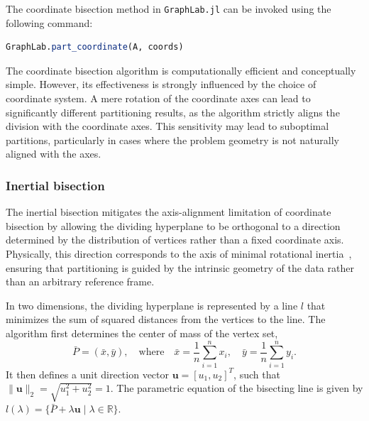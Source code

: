     
    
    
    
    The coordinate bisection method in \texttt{GraphLab.jl} can be invoked using the following command:
    
    \begin{lstlisting}[language=Julia]
    GraphLab.part_coordinate(A, coords)
    \end{lstlisting}
    
    The coordinate bisection algorithm is computationally efficient and conceptually simple.
    However, its effectiveness is strongly influenced by the choice of coordinate system.
    A mere rotation of the coordinate axes can lead to significantly different partitioning results,
    as the algorithm strictly aligns the division with the coordinate axes.
    This sensitivity may lead to suboptimal partitions, particularly in cases where the problem geometry
    is not naturally aligned with the axes.
    \subsubsection{Inertial bisection}
    The inertial bisection mitigates the axis-alignment limitation of coordinate bisection by
    allowing the dividing hyperplane to be orthogonal to a direction determined by the
    distribution of vertices rather than a fixed coordinate axis. Physically, this direction corresponds to the axis of minimal rotational inertia~\cite{elsner1997graph}, ensuring that
    partitioning is guided by the intrinsic geometry of the data rather than an arbitrary reference frame.
    
    In two dimensions, the dividing hyperplane is
    represented by a line $l$ that minimizes the sum
    of squared distances from the vertices to the line. The algorithm first determines the center of mass of the vertex set,
    \begin{equation}
      \bar{P}=(\bar{x}, \bar{y}), \quad \text{where} \quad  \bar{x} = \frac{1}{n}\sum_{i=1}^n x_i, \quad \bar{y} = \frac{1}{n}\sum_{i=1}^n y_i\text{.}
    \end{equation}
    It then defines a unit direction vector $\mathbf{u}=[u_1, u_2]^T$, such that 
    $\|\mathbf{u}\|_2 = \sqrt{u_1^2+u_2^2} = 1$.
    The parametric equation
    of the bisecting line is given by
    $l(\lambda) = \{\bar{P} + \lambda \mathbf{u}  \mid \lambda \in \mathbb{R} \}$.
    
